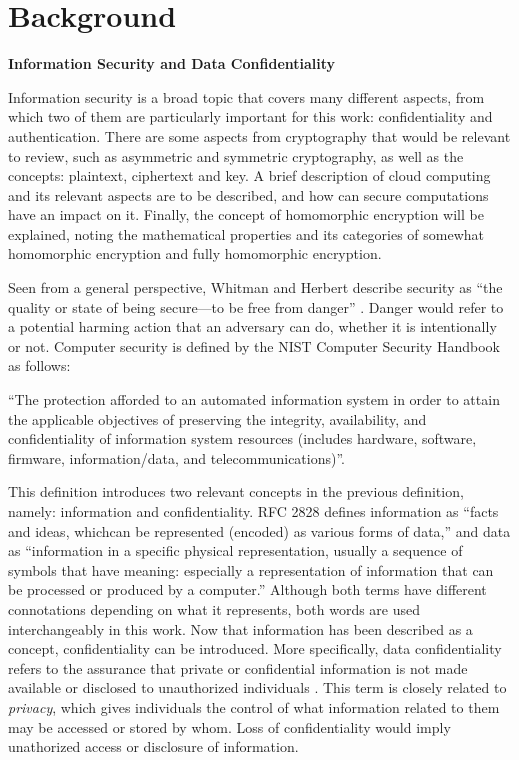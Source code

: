 \chapter{Background}
\label{background}

\textbf{Information Security and Data Confidentiality}

Information security is a broad topic that covers many different aspects, from which two of them are particularly important for this work: confidentiality and authentication. There are some aspects from cryptography that would be relevant to review, such as asymmetric and symmetric cryptography, as well as the concepts: plaintext, ciphertext and key. A brief description of cloud computing and its relevant aspects are to be described, and how can secure computations have an impact on it. Finally, the concept of homomorphic encryption will be explained, noting the mathematical properties and its categories of somewhat homomorphic encryption and fully homomorphic encryption.

Seen from a general perspective, Whitman and Herbert describe security as ``the quality or state of being secure---to be free from danger'' \cite{PrinciplesInformationSecurity}. Danger would refer to a potential harming action that an adversary can do, whether it is intentionally or not. Computer security is defined by the NIST Computer Security Handbook as follows:

``The protection afforded to an automated information system in order to attain the applicable objectives of preserving the integrity, availability, and confidentiality of information system resources (includes hardware, software, firmware, information/data, and telecommunications)''.

This definition introduces two relevant concepts in the previous definition, namely: information and confidentiality. RFC 2828 defines information as ``facts and ideas, whichcan be represented (encoded) as various forms of data,'' and data as ``information in a specific physical representation, usually a sequence of symbols that have meaning: especially a representation of information that can be processed or produced by a computer.'' Although both terms have different connotations depending on what it represents, both words are used interchangeably in this work. Now that information has been described as a concept, confidentiality can be introduced. More specifically, data confidentiality refers to the assurance that private or confidential information is not made available or disclosed to unauthorized individuals \cite{CryptoStallings}. This term is closely related to \textit{privacy}, which gives individuals the control of what information related to them may be accessed or stored by whom. Loss of confidentiality would imply unathorized access or disclosure of information.

